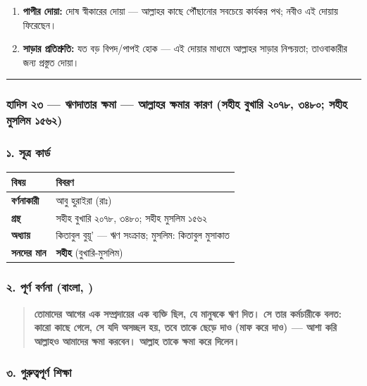 \begin{enumerate}
\item \textbf{পাপীর দোয়া:} দোষ স্বীকারের দোয়া — আল্লাহর কাছে পৌঁছানোর সবচেয়ে কার্যকর পথ; নবীও এই দোয়ায় ফিরেছেন।
\item \textbf{সাড়ার প্রতিশ্রুতি:} যত বড় বিপদ/পাপই হোক — এই দোয়ার মাধ্যমে আল্লাহর সাড়ার নিশ্চয়তা; তাওবাকারীর জন্য প্রস্তুত দোয়া।
\end{enumerate}
\medskip\hrule\medskip

\subsubsection*{হাদিস ২৩ — ঋণদাতার ক্ষমা — আল্লাহর ক্ষমার কারণ (সহীহ বুখারি ২০৭৮, ৩৪৮০; সহীহ মুসলিম ১৫৬২)}

\subsubsection*{১. সূত্র কার্ড}

\begin{table}[h]\centering\small
\begin{tabular}{ll}
বিষয় & বিবরণ \\
\hline
\textbf{বর্ণনাকারী} & আবু হুরাইরা (রাঃ) \\
\textbf{গ্রন্থ} & সহীহ বুখারি ২০৭৮, ৩৪৮০; সহীহ মুসলিম ১৫৬২ \\
\textbf{অধ্যায়} & কিতাবুল বুয়ূ' — ঋণ সংক্রান্ত; মুসলিম: কিতাবুল মুসাকাত \\
\textbf{সনদের মান} & \textbf{সহীহ} (বুখারি-মুসলিম) \\
\hline
\end{tabular}
\end{table}

\subsubsection*{২. পূর্ণ বর্ণনা (বাংলা, )}

\begin{quote}
\textbf{তোমাদের আগের এক সম্প্রদায়ের এক ব্যক্তি ছিল, যে মানুষকে ঋণ দিত। সে তার কর্মচারীকে বলত: কারো কাছে গেলে, সে যদি অসচ্ছল হয়, তবে তাকে ছেড়ে দাও (মাফ করে দাও) — আশা করি আল্লাহও আমাদের ক্ষমা করবেন। আল্লাহ তাকে ক্ষমা করে দিলেন।}
\end{quote}

\subsubsection*{৩. গুরুত্বপূর্ণ শিক্ষা}

